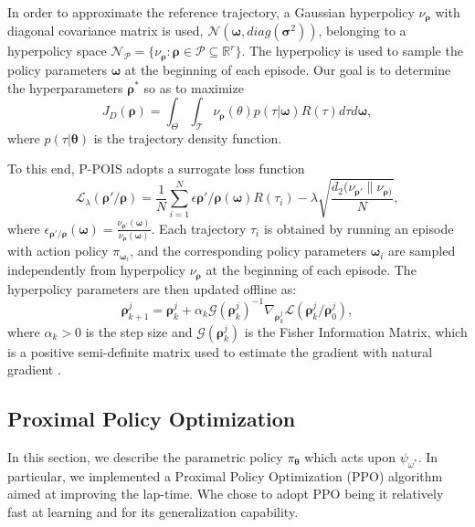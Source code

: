 In order to approximate the reference trajectory, a Gaussian hyperpolicy $\nu_{\boldsymbol \rho}$ with diagonal covariance matrix is used, $\mathcal{N}(\boldsymbol \omega,diag(\boldsymbol \sigma^2))$, belonging to a hyperpolicy space \(\mathcal{N}_{\mathcal{P}} = \{\nu_{\boldsymbol \rho}:\boldsymbol \rho \in \mathcal{P} \subseteq \mathbb{R}^r\}\). The hyperpolicy is used to sample the policy parameters $\boldsymbol \omega$ at the beginning of each episode.
Our goal is to determine the hyperparameters \(\boldsymbol \rho^*\) so as to maximize \begin{equation} J_D( \boldsymbol \rho) = \int_{\Theta} \int_{\mathcal{T}} \nu_{\boldsymbol \rho}( \theta)p(\tau| \boldsymbol \omega)R(\tau)d\tau d \boldsymbol \omega,  \label{eq:jdro} \end{equation} where $p(\tau|\boldsymbol \theta)$ is the trajectory density function. 

To this end, P-POIS adopts a surrogate loss function
\begin{equation}\mathcal{L}_\lambda(\boldsymbol \rho'/\boldsymbol \rho)=\frac{1}{N} \sum^N_{i=1}\epsilon{\boldsymbol \rho'/ \boldsymbol\rho}(\boldsymbol \omega)R(\tau_i)-\lambda\sqrt{\frac{d_2(\nu_{\boldsymbol \rho'}\|\nu_{\boldsymbol \rho)}}{N}},\end{equation} where 
\(\epsilon_{\boldsymbol \rho'/\boldsymbol \rho}(\boldsymbol \omega)=\frac{\nu_{\boldsymbol\rho'}(\boldsymbol\omega)}{\nu_{\boldsymbol \rho}(\boldsymbol\omega)}.\)
Each trajectory $\tau_i$ is obtained by running an episode with action policy $\pi_{\boldsymbol \omega_i}$, and the corresponding policy parameters $\boldsymbol \omega_i$ are sampled independently from hyperpolicy $\nu_{\boldsymbol \rho}$ at the beginning of each episode. The hyperpolicy parameters are then updated offline as: \begin{equation}\boldsymbol \rho^j_{k+1}=\boldsymbol \rho^j_k+\alpha_k\mathcal{G}(\boldsymbol \rho_k^j)^{-1}\nabla_{\boldsymbol \rho_k^j}\mathcal{L}(\boldsymbol\rho^j_k/\boldsymbol \rho^j_0),\end{equation} where $\alpha_k > 0$ is the step size and $\mathcal{G}(\boldsymbol \rho^j_k)$ is the Fisher Information Matrix, which is a positive semi-definite matrix used to estimate the gradient with natural gradient \cite{fisher}.


\subsection{Proximal Policy Optimization}
In this section, we describe the parametric policy $\pi_{\boldsymbol \theta}$ which acts upon $\psi_{\omega^*}$. In particular, we implemented a Proximal Policy Optimization (PPO) algorithm aimed at improving the lap-time. 
Whe chose to adopt PPO being it relatively fast at learning and for its generalization capability.

